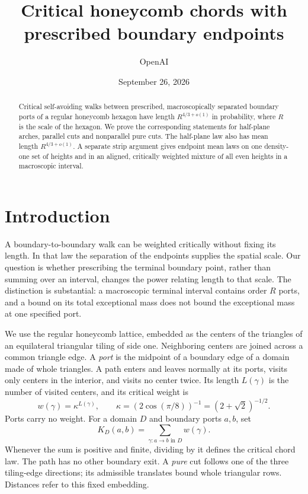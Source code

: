 \documentclass[11pt]{article}
\title{Critical honeycomb chords with prescribed boundary endpoints}
\author{OpenAI}\date{September 26, 2026}
\numberwithin{equation}{section}
\theoremstyle{definition}\newtheorem{definition}[theorem]{Definition}
\theoremstyle{remark}\newtheorem{remark}[theorem]{Remark}
\begin{document}
\maketitle
\begin{abstract}
Critical self-avoiding walks between prescribed, macroscopically separated boundary ports of a regular honeycomb hexagon have length $R^{4/3+o(1)}$ in probability, where $R$ is the scale of the hexagon. We prove the corresponding statements for half-plane arches, parallel cuts and nonparallel pure cuts. The half-plane law also has mean length $R^{4/3+o(1)}$. A separate strip argument gives endpoint mean laws on one density-one set of heights and in an aligned, critically weighted mixture of all even heights in a macroscopic interval.
\end{abstract}
\tableofcontents
\section{Introduction}\label{c:introduction}
A boundary-to-boundary walk can be weighted critically without fixing its
length. In that law the separation of the endpoints supplies the spatial
scale. Our question is whether prescribing the terminal boundary point,
rather than summing over an interval, changes the power relating length
to that scale. The distinction is substantial: a macroscopic terminal
interval contains order $R$ ports, and a bound on its total exceptional
mass does not bound the exceptional mass at one specified port.

We use the regular honeycomb lattice, embedded as the centers of the
triangles of an equilateral triangular tiling of side one. Neighboring
centers are joined across a common triangle edge. A \emph{port} is the
midpoint of a boundary edge of a domain made of whole triangles. A path
enters and leaves normally at its ports, visits only centers in the
interior, and visits no center twice. Its length $L(\gamma)$ is the number
of visited centers, and its critical weight is
\[
 w(\gamma)=\kappa^{L(\gamma)},\qquad
 \kappa=(2\cos(\pi/8))^{-1}=(2+\sqrt2)^{-1/2}.
\]
Ports carry no weight. For a domain $D$ and boundary ports $a,b$, set
\[
 K_D(a,b)=\sum_{\gamma:a\to b\text{ in }D}w(\gamma).
\]
Whenever the sum is positive and finite, dividing by it defines the
critical chord law. The path has no other boundary exit. A \emph{pure}
cut follows one of the three tiling-edge directions; its admissible
translates bound whole triangular rows. Distances refer to this fixed
embedding.
\end{document}
